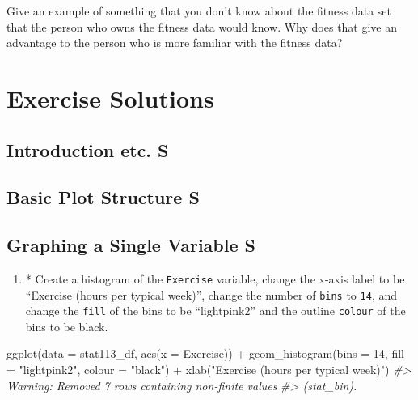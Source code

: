 \documentclass[
]{book}
\newenvironment{Shaded}{\begin{snugshade}}{\end{snugshade}}
\newcommand{\AttributeTok}[1]{\textcolor[rgb]{0.77,0.63,0.00}{#1}}
\newcommand{\CommentTok}[1]{\textcolor[rgb]{0.56,0.35,0.01}{\textit{#1}}}
\newcommand{\DecValTok}[1]{\textcolor[rgb]{0.00,0.00,0.81}{#1}}
\newcommand{\FunctionTok}[1]{\textcolor[rgb]{0.00,0.00,0.00}{#1}}
\newcommand{\NormalTok}[1]{#1}
\newcommand{\SpecialCharTok}[1]{\textcolor[rgb]{0.00,0.00,0.00}{#1}}
\newcommand{\StringTok}[1]{\textcolor[rgb]{0.31,0.60,0.02}{#1}}
\providecommand{\tightlist}{%
  \setlength{\itemsep}{0pt}\setlength{\parskip}{0pt}}
\begin{document}
Give an example of something that you don't know about the fitness data set that the person who owns the fitness data would know. Why does that give an advantage to the person who is more familiar with the fitness data?

\hypertarget{solutions-2}{%
\section{Exercise Solutions}\label{solutions-2}}

\hypertarget{introduction-etc.-s}{%
\subsection{Introduction etc. S}\label{introduction-etc.-s}}

\hypertarget{basic-plot-structure-s}{%
\subsection{Basic Plot Structure S}\label{basic-plot-structure-s}}

\hypertarget{graphing-a-single-variable-s}{%
\subsection{Graphing a Single Variable S}\label{graphing-a-single-variable-s}}

\begin{enumerate}
\def\labelenumi{\arabic{enumi}.}
\setcounter{enumi}{3}
\tightlist
\item
  * Create a histogram of the \texttt{Exercise} variable, change the x-axis label to be ``Exercise (hours per typical week)'', change the number of \texttt{bins} to \texttt{14}, and change the \texttt{fill} of the bins to be ``lightpink2'' and the outline \texttt{colour} of the bins to be black.
\end{enumerate}

\begin{Shaded}
\begin{Highlighting}[]
\FunctionTok{ggplot}\NormalTok{(}\AttributeTok{data =}\NormalTok{ stat113\_df, }\FunctionTok{aes}\NormalTok{(}\AttributeTok{x =}\NormalTok{ Exercise)) }\SpecialCharTok{+}
  \FunctionTok{geom\_histogram}\NormalTok{(}\AttributeTok{bins =} \DecValTok{14}\NormalTok{, }\AttributeTok{fill =} \StringTok{"lightpink2"}\NormalTok{, }\AttributeTok{colour =} \StringTok{"black"}\NormalTok{) }\SpecialCharTok{+}
  \FunctionTok{xlab}\NormalTok{(}\StringTok{"Exercise (hours per typical week)"}\NormalTok{)}
\CommentTok{\#\textgreater{} Warning: Removed 7 rows containing non{-}finite values}
\CommentTok{\#\textgreater{} (stat\_bin).}
\end{Highlighting}
\end{Shaded}
\end{document}
